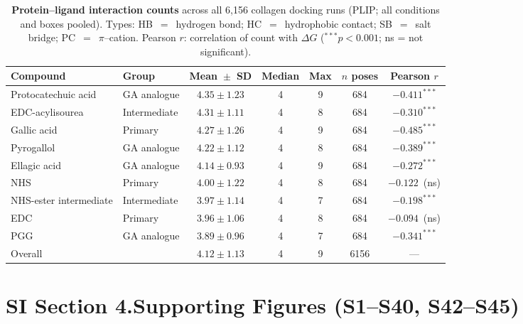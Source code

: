 \documentclass[11pt]{article}
\begin{document}
\begin{table}[H]
\small
\centering
\caption{\textbf{Protein--ligand interaction counts} across all 6,156 collagen
  docking runs (PLIP; all conditions and boxes pooled).
  Types: HB~$=$~hydrogen bond; HC~$=$~hydrophobic contact; SB~$=$~salt bridge;
  PC~$=$~$\pi$--cation.
  Pearson $r$: correlation of count with $\Delta G$
  ($^{***}p < 0.001$; ns = not significant).}
\label{tab:si_interactions}
\begin{tabular}{llccccc}
\toprule
\textbf{Compound} & \textbf{Group}
  & \textbf{Mean~$\pm$~SD} & \textbf{Median} & \textbf{Max}
  & \textbf{$n$ poses} & \textbf{Pearson $r$} \\
\midrule
Protocatechuic acid    & GA analogue  & $4.35 \pm 1.23$ & 4 & 9 & 684 & $-0.411^{***}$ \\
EDC-acylisourea        & Intermediate & $4.31 \pm 1.11$ & 4 & 8 & 684 & $-0.310^{***}$ \\
Gallic acid            & Primary      & $4.27 \pm 1.26$ & 4 & 9 & 684 & $-0.485^{***}$ \\
Pyrogallol             & GA analogue  & $4.22 \pm 1.12$ & 4 & 8 & 684 & $-0.389^{***}$ \\
Ellagic acid           & GA analogue  & $4.14 \pm 0.93$ & 4 & 9 & 684 & $-0.272^{***}$ \\
NHS                    & Primary      & $4.00 \pm 1.22$ & 4 & 8 & 684 & $-0.122$~(ns) \\
NHS-ester intermediate & Intermediate & $3.97 \pm 1.14$ & 4 & 7 & 684 & $-0.198^{***}$ \\
EDC                    & Primary      & $3.96 \pm 1.06$ & 4 & 8 & 684 & $-0.094$~(ns) \\
PGG                    & GA analogue  & $3.89 \pm 0.96$ & 4 & 7 & 684 & $-0.341^{***}$ \\
\midrule
Overall                &              & $4.12 \pm 1.13$ & 4 & 9 & 6156 & --- \\
\bottomrule
\end{tabular}
\end{table}

\label{si:tables_end}

\section*{SI Section 4.\quad Supporting Figures (S1--S40, S42--S45)}
\label{si:figures}
\end{document}
